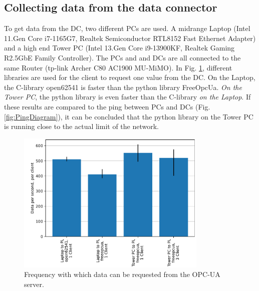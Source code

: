 \documentclass[conference]{IEEEtran}
\begin{document}
\subsection{ Collecting data from the data connector}
To get  data from the DC, two different PCs are used. A midrange Laptop (Intel 11.Gen Core i7-1165G7, Realtek Semiconductor
RTL8152 Fast Ethernet Adapter) and a high end Tower PC (Intel 13.Gen Core i9-13900KF, Realtek Gaming R2.5GbE Family Controller).
The PCs and and DCs are all connected to the same Router (tp-link Archer C80 AC1900 MU-MiMO). In Fig. \ref{fig:OPCUASpeed1D}, different libraries are used for the client to request one value from the DC.
On the Laptop, the C-library open62541 is faster than the python library FreeOpcUa.
\textit{On the Tower PC}, the python library is even faster than the C-library \textit{on the Laptop}.
If these results are compared to the ping between  PCs and DCs (Fig. \ref{fig:PingDiagram}), it can be concluded that the python library on the Tower PC is running close to the actual limit of the network.\\

\begin{figure}[t]
    \centerline{\includegraphics[width=9.1cm]{Pictures/OPCUASpeed1D.pdf}}
    \caption{Frequency with which data can be requested from the OPC-UA server.}
    \label{fig:OPCUASpeed1D}
\end{figure}
\end{document}
